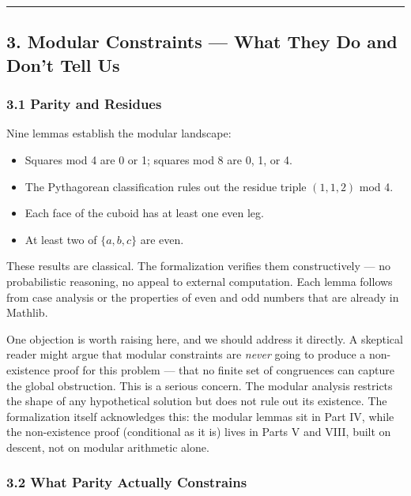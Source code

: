 \begin{center}\rule{0.5\linewidth}{0.5pt}\end{center}

\subsection{3. Modular Constraints --- What They Do and Don't Tell
Us}\label{modular-constraints-what-they-do-and-dont-tell-us}

\subsubsection{3.1 Parity and Residues}\label{parity-and-residues}

Nine lemmas establish the modular landscape:

\begin{itemize}
\tightlist
\item
  Squares mod 4 are 0 or 1; squares mod 8 are 0, 1, or 4.
\item
  The Pythagorean classification rules out the residue triple
  \((1, 1, 2)\) mod 4.
\item
  Each face of the cuboid has at least one even leg.
\item
  At least two of \(\{a, b, c\}\) are even.
\end{itemize}

These results are classical. The formalization verifies them
constructively --- no probabilistic reasoning, no appeal to external
computation. Each lemma follows from case analysis or the properties of
even and odd numbers that are already in Mathlib.

One objection is worth raising here, and we should address it directly.
A skeptical reader might argue that modular constraints are \emph{never}
going to produce a non-existence proof for this problem --- that no
finite set of congruences can capture the global obstruction. This is a
serious concern. The modular analysis restricts the shape of any
hypothetical solution but does not rule out its existence. The
formalization itself acknowledges this: the modular lemmas sit in Part
IV, while the non-existence proof (conditional as it is) lives in Parts
V and VIII, built on descent, not on modular arithmetic alone.

\subsubsection{3.2 What Parity Actually
Constrains}\label{what-parity-actually-constrains}

